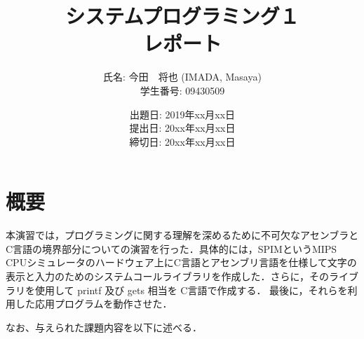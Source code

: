 \documentclass[a4j,11pt]{jarticle}
\title{システムプログラミング１ \\
       レポート}
\author{氏名: 今田　将也 (IMADA, Masaya) \\
        学生番号: 09430509}
\date{出題日: 2019年xx月xx日 \\
      提出日: 20xx年xx月xx日 \\
      締切日: 20xx年xx月xx日 \\}  %
\begin{document}
\maketitle


\section{概要} \label{chap:abstract}

本演習では，プログラミングに関する理解を深めるために不可欠なアセンブラとC言語の境界部分についての演習を行った．具体的には，SPIMというMIPS　CPUシミュレータのハードウェア上にC言語とアセンブリ言語を仕様して文字の表示と入力のためのシステムコールライブラリを作成した．さらに，そのライブラリを使用して printf 及び gets 相当を C言語で作成する． 最後に，それらを利用した応用プログラムを動作させた．

なお、与えられた課題内容を以下に述べる．
\end{document}
